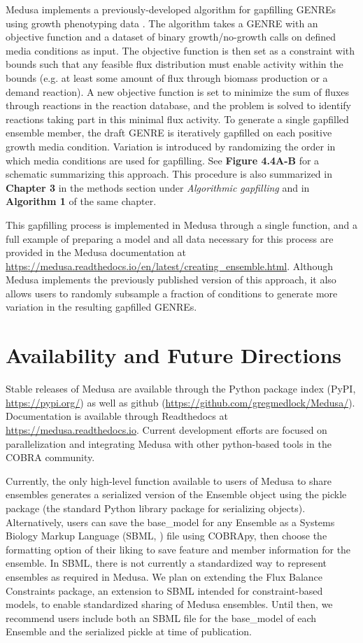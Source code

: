 \documentclass[11pt,twocolumn,notitlepage,openany,twoside]{book}
\begin{document}
\begin{refsection}
Medusa implements a previously-developed algorithm for gapfilling GENREs using growth phenotyping data \cite{Biggs2017-md,Medlock2018-kx}. The algorithm takes a GENRE with an objective function and a dataset of binary growth/no-growth calls on defined media conditions as input. The objective function is then set as a constraint with bounds such that any feasible flux distribution must enable activity within the bounds (e.g. at least some amount of flux through biomass production or a demand reaction). A new objective function is set to minimize the sum of fluxes through reactions in the reaction database, and the problem is solved to identify reactions taking part in this minimal flux activity. To generate a single gapfilled ensemble member, the draft GENRE is iteratively gapfilled on each positive growth media condition. Variation is introduced by randomizing the order in which media conditions are used for gapfilling. See \textbf{Figure 4.4A-B} for a schematic summarizing this approach. This procedure is also summarized in \textbf{Chapter 3} in the methods section under \textit{Algorithmic gapfilling} and in \textbf{Algorithm 1} of the same chapter.

This gapfilling process is implemented in Medusa through a single function, and a full example of preparing a model and all data necessary for this process are provided in the Medusa documentation at \url{https://medusa.readthedocs.io/en/latest/creating_ensemble.html}. Although Medusa implements the previously published version of this approach, it also allows users to randomly subsample a fraction of conditions to generate more variation in the resulting gapfilled GENREs.

\section{Availability and Future Directions}

Stable releases of Medusa are available through the Python package index (PyPI, \url{https://pypi.org/}) as well as github (\url{https://github.com/gregmedlock/Medusa/}). Documentation is available through Readthedocs at \url{https://medusa.readthedocs.io}. Current development efforts are focused on parallelization and integrating Medusa with other python-based tools in the COBRA community.

Currently, the only high-level function available to users of Medusa to share ensembles generates a serialized version of the Ensemble object using the pickle package (the standard Python library package for serializing objects). Alternatively, users can save the base\_model for any Ensemble as a Systems Biology Markup Language (SBML, \cite{Hucka2003-io}) file using COBRApy, then choose the formatting option of their liking to save feature and member information for the ensemble. In SBML, there is not currently a standardized way to represent ensembles as required in Medusa. We plan on extending the Flux Balance Constraints package, an extension to SBML intended for constraint-based models, to enable standardized sharing of Medusa ensembles. Until then, we recommend users include both an SBML file for the base\_model of each Ensemble and the serialized pickle at time of publication.


\end{refsection}
\end{document}
